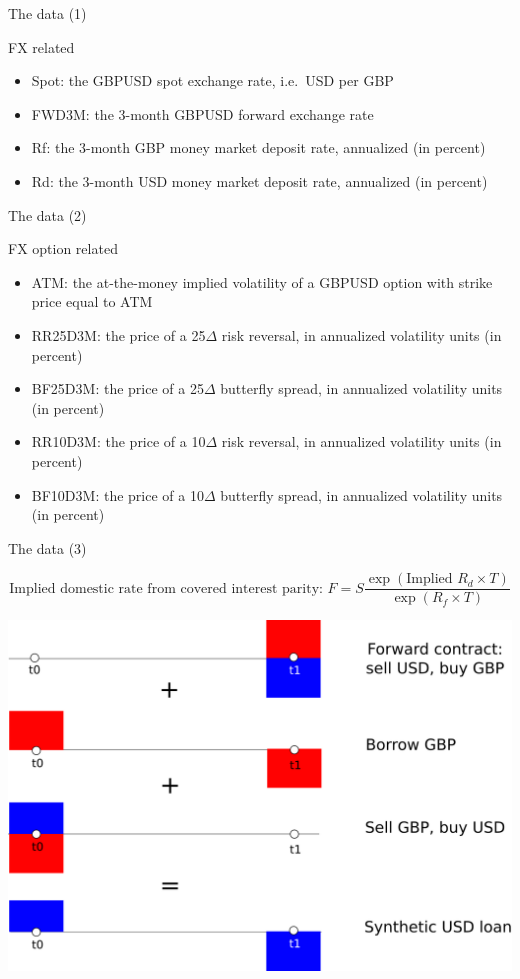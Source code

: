 \documentclass[ignorenonframetext,aspectratio=169]{beamer}
\providecommand{\tightlist}{%
  \setlength{\itemsep}{0pt}\setlength{\parskip}{0pt}}
\begin{document}
\begin{frame}{The data (1)}

FX related

\begin{itemize}
\tightlist
\item
  Spot: the GBPUSD spot exchange rate, i.e.~USD per GBP
\item
  FWD3M: the 3-month GBPUSD forward exchange rate
\item
  Rf: the 3-month GBP money market deposit rate, annualized (in percent)
\item
  Rd: the 3-month USD money market deposit rate, annualized (in percent)
\end{itemize}

\end{frame}

\begin{frame}{The data (2)}

FX option related

\begin{itemize}
\tightlist
\item
  ATM: the at-the-money implied volatility of a GBPUSD option with
  strike price equal to ATM
\item
  RR25D3M: the price of a 25\(\Delta\) risk reversal, in annualized
  volatility units (in percent)
\item
  BF25D3M: the price of a 25\(\Delta\) butterfly spread, in annualized
  volatility units (in percent)
\item
  RR10D3M: the price of a 10\(\Delta\) risk reversal, in annualized
  volatility units (in percent)
\item
  BF10D3M: the price of a 10\(\Delta\) butterfly spread, in annualized
  volatility units (in percent)
\end{itemize}

\end{frame}

\begin{frame}{The data (3)}

\[ \text{Implied domestic rate from covered interest parity:  }F = S \frac{\exp \left(\text{Implied } R_d \times T\right)}{\exp \left(R_f \times T\right)} \]

\begin{center}\includegraphics[width=0.6\linewidth]{images/figSyntheticUSDLoan} \end{center}

\end{frame}
\end{document}
